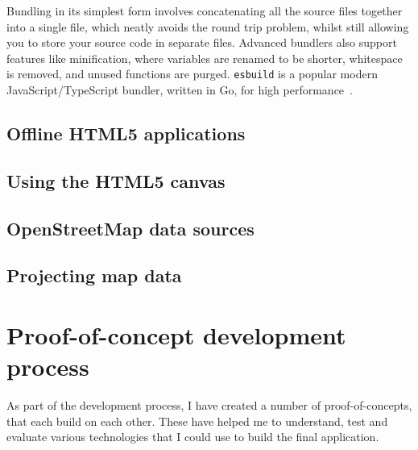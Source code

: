 \documentclass{final_report}
\begin{document}
Bundling in its simplest form involves concatenating all the source files together into a single file, which neatly avoids the round trip problem, whilst still allowing you to store your source code in separate files. Advanced bundlers also support features like minification, where variables are renamed to be shorter, whitespace is removed, and unused functions are purged. \texttt{esbuild} is a popular modern JavaScript/TypeScript bundler, written in Go, for high performance~\cite{esbuild}.

\section{Offline HTML5 applications}\label{sec:offline-html-applications}



\section{Using the HTML5 canvas}



\section{OpenStreetMap data sources}\label{sec:osm-data-sources}



\section{Projecting map data}\label{sec:projecting-map-data}



\clearpage
\chapter{Proof-of-concept development process}


As part of the development process, I have created a number of proof-of-concepts, that each build on each other. These have helped me to understand, test and evaluate various technologies that I could use to build the final application.
\end{document}
